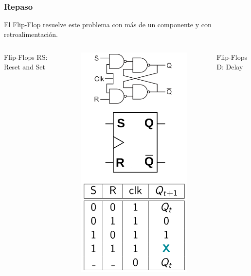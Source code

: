 \documentclass[10pt]{beamer}
\begin{document}
\begin{frame}
\frametitle{Repaso}
\begin{mdframed}[backgroundcolor=frenchblue!20]
  El Flip-Flop resuelve este problema con m\'as de un componente y con retroalimentaci\'on.
\end{mdframed}
\vspace{0.2cm}
\begin{columns}
\pause
        Flip-Flops RS: Reset and Set

         \begin{figure}[h!]
             \centering
             \includegraphics[scale=0.18]{flipRS.png}
         \end{figure}
\pause
        Flip-Flops D: Delay


\end{columns}
\end{frame}
\end{document}
